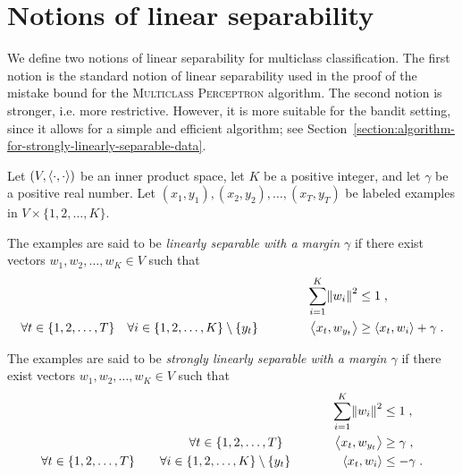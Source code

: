 \section{Notions of linear separability}
\label{section:notions-of-linear-separability}

We define two notions of linear separability for multiclass classification. The
first notion is the standard notion of linear separability used in the proof of
the mistake bound for the \textsc{Multiclass Perceptron} algorithm. The second
notion is stronger, i.e. more restrictive. However, it is more suitable for the
bandit setting, since it allows for a simple and efficient algorithm; see
Section~\ref{section:algorithm-for-strongly-linearly-separable-data}.

\begin{definition}
Let $(V,\left\langle \cdot, \cdot \right\rangle)$ be an inner product space, let $K$ be a positive
integer, and let $\gamma$ be a positive real number. Let $(x_1, y_1), (x_2,
y_2), \dots, (x_T, y_T)$ be labeled examples in $V \times \{1,2,\dots,K\}$.

The examples are said to be \emph{linearly separable with a
margin $\gamma$} if there exist vectors $w_1, w_2, \dots, w_K \in V$ such
that
\begin{align}
\label{equation:linear-separability-1}
\sum_{i=1}^K \norm{w_i}^2 & \le 1 \; , \\
\label{equation:linear-separability-2}
\forall t \in \{1,2,\dots,T\} \quad \forall i \in \{1,2,\dots, K\} \setminus \{y_t\} \qquad \qquad \left\langle x_t, w_{y_t} \right\rangle & \ge \left\langle x_t, w_i \right\rangle + \gamma \; .
\end{align}

The examples are said to be \emph{strongly linearly separable with a
margin $\gamma$} if there exist vectors $w_1, w_2, \dots, w_K \in V$ such
that
\begin{align}
\label{equation:strong-linear-separability-1}
\sum_{i=1}^K \norm{w_i}^2 & \le 1 \; , \\
\label{equation:strong-linear-separability-2}
\forall t \in \{1,2,\dots,T\} \qquad \qquad \left\langle x_t, w_{y_t} \right\rangle &\ge \gamma \; , \\
\label{equation:strong-linear-separability-3}
\forall t \in \{1,2,\dots,T\} \qquad \forall i \in \{1,2,\dots, K\} \setminus \{y_t\} \qquad \qquad \left\langle x_t, w_i \right\rangle & \le - \gamma \; .
\end{align}
\end{definition}

